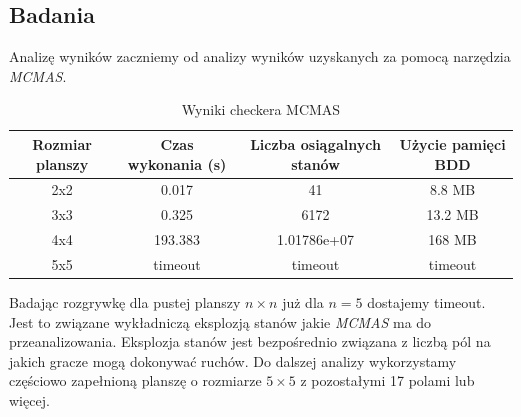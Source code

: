 \subsection{Badania}
Analizę wyników zaczniemy od analizy wyników uzyskanych za pomocą narzędzia \textit{MCMAS}.
\begin{table}[h!]
    \centering
    \begin{tabular}{|c|c|c|c|}
    \hline
    Rozmiar planszy & Czas wykonania (s) & Liczba osiągalnych stanów & Użycie pamięci BDD  \\
    \hline
     2x2 &  0.017 &41  & 8.8 MB  \\
     3x3 & 0.325 &6172 & 13.2 MB \\
     4x4&193.383 &1.01786e+07 & 168 MB \\
     5x5 & timeout & timeout & timeout \\
    \hline
    \end{tabular}
    \caption{Wyniki checkera MCMAS}
    \label{table:mcmas_results}
    \end{table}
    Badając rozgrywkę dla pustej planszy $n \times n$ już dla $n=5$ dostajemy timeout.
    Jest to związane wykładniczą eksplozją stanów jakie \textit{MCMAS} ma do przeanalizowania.
    Eksplozja stanów jest bezpośrednio związana z liczbą pól na jakich gracze mogą 
    dokonywać ruchów. Do dalszej analizy wykorzystamy częściowo zapełnioną planszę o rozmiarze 
    $5 \times 5 $ z pozostałymi 17 polami lub więcej.

